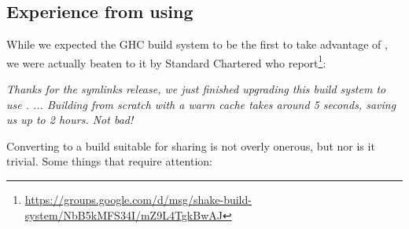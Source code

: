 \subsection{Experience from using \Cloud \Shake}\label{sec-using-cloud-shake}

While we expected the GHC build system to be the first to take advantage of
\Cloud \Shake, we were actually beaten to it by Standard Chartered who
report\footnote{\url{https://groups.google.com/d/msg/shake-build-system/NbB5kMFS34I/mZ9L4TgkBwAJ}}:

\vspace{1mm}
\begin{center}
\parbox{0.8 \textwidth}{\emph{Thanks for the symlinks release, we just finished upgrading this build
system to use \cmd{-}. ... Building from scratch with a warm cache
takes around 5 seconds, saving us up to 2 hours. Not bad!}}
\end{center}
\vspace{1mm}


Converting to a build suitable for sharing is
not overly onerous, but nor is it trivial. Some things that require attention:

